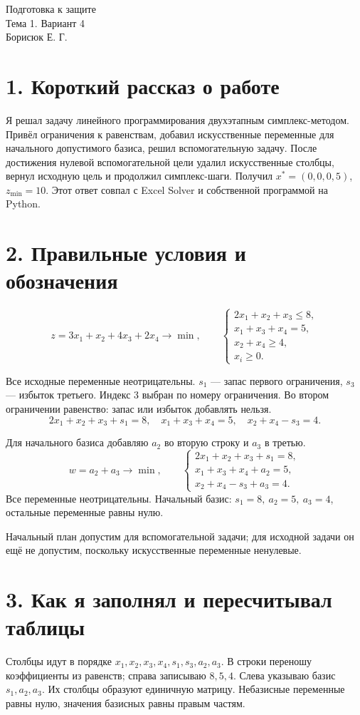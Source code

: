 \documentclass[12pt,a4paper]{article}
\begin{document}
\begin{center}\Large Подготовка к защите\\[2mm]\large Тема 1. Вариант 4\\Борисюк Е. Г.\end{center}
\section*{1. Короткий рассказ о работе}
Я решал задачу линейного программирования двухэтапным симплекс-методом.
Привёл ограничения к равенствам, добавил искусственные переменные
для начального допустимого базиса, решил вспомогательную задачу.
После достижения нулевой вспомогательной цели удалил искусственные столбцы,
вернул исходную цель и продолжил симплекс-шаги.
Получил $x^*=(0,0,0,5)$, $z_{\min}=10$.
Этот ответ совпал с Excel Solver и собственной программой на Python.
\section*{2. Правильные условия и обозначения}
\[
z=3x_1+x_2+4x_3+2x_4\to\min,\qquad
\begin{cases}
2x_1+x_2+x_3\le8,\\
x_1+x_3+x_4=5,\\
x_2+x_4\ge4,\\
x_i\ge0.
\end{cases}
\]

Все исходные переменные неотрицательны. $s_1$ --- запас первого ограничения,
$s_3$ --- избыток третьего. Индекс 3 выбран по номеру ограничения.
Во втором ограничении равенство: запас или избыток добавлять нельзя.
\[
2x_1+x_2+x_3+s_1=8,\quad
x_1+x_3+x_4=5,\quad
x_2+x_4-s_3=4.
\]

Для начального базиса добавляю $a_2$ во вторую строку и $a_3$ в третью.
\[
w=a_2+a_3\to\min,\qquad
\begin{cases}
2x_1+x_2+x_3+s_1=8,\\
x_1+x_3+x_4+a_2=5,\\
x_2+x_4-s_3+a_3=4.
\end{cases}
\]
Все переменные неотрицательны. Начальный базис:
$s_1=8,\ a_2=5,\ a_3=4$, остальные переменные равны нулю.

Начальный план допустим для вспомогательной задачи; для исходной задачи он
ещё не допустим, поскольку искусственные переменные ненулевые.
\section*{3. Как я заполнял и пересчитывал таблицы}
Столбцы идут в порядке $x_1,x_2,x_3,x_4,s_1,s_3,a_2,a_3$.
В строки переношу коэффициенты из равенств; справа записываю $8,5,4$.
Слева указываю базис $s_1,a_2,a_3$. Их столбцы образуют единичную матрицу.
Небазисные переменные равны нулю, значения базисных равны правым частям.
\end{document}
